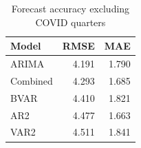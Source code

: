 \begin{table}

\caption{\label{tab:forecast-accuracy-ex-covid}Forecast accuracy excluding COVID quarters}
\centering
\begin{tabular}[t]{lrr}
\toprule
Model & RMSE & MAE\\
\midrule
ARIMA & 4.191 & 1.790\\
Combined & 4.293 & 1.685\\
BVAR & 4.410 & 1.821\\
AR2 & 4.477 & 1.663\\
VAR2 & 4.511 & 1.841\\
\bottomrule
\end{tabular}
\end{table}
